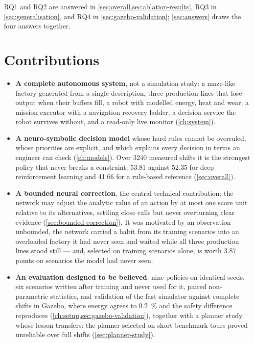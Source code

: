 RQ1 and RQ2 are answered in \cref{sec:overall,sec:ablation-results}, RQ3 in
\cref{sec:generalisation}, and RQ4 in \cref{sec:gazebo-validation}; \cref{sec:answers} draws the
four answers together.

\section{Contributions}
\label{sec:contributions}

\begin{itemize}[leftmargin=*, itemsep=0.25em]
  \item \textbf{A complete autonomous system}, not a simulation study: a maze-like factory
        generated from a single description, three production lines that lose output when their
        buffers fill, a robot with modelled energy, heat and wear, a mission executor with a
        navigation recovery ladder, a decision service the robot survives without, and a read-only
        live monitor (\cref{ch:system}).

  \item \textbf{A neuro-symbolic decision model} whose hard rules cannot be overruled, whose
        priorities are explicit, and which explains every decision in terms an engineer can check
        (\cref{ch:models}). Over \num{3240} measured shifts it is the strongest policy that never
        breaks a constraint: \num{53.81} against \num{52.35} for deep reinforcement learning and
        \num{41.66} for a rule-based reference (\cref{sec:overall}).

  \item \textbf{A bounded neural correction}, the central technical contribution: the network may
        adjust the analytic value of an action by at most one score unit relative to its
        alternatives, settling close calls but never overturning clear evidence
        (\cref{sec:bounded-correction}). It was motivated by an observation --- unbounded, the
        network carried a habit from its training scenarios into an overloaded factory it had never
        seen and waited while all three production lines stood still --- and, selected on training
        scenarios alone, is worth \num{3.87} points on scenarios the model had never seen.

  \item \textbf{An evaluation designed to be believed}: nine policies on identical seeds, six
        scenarios written after training and never used for it, paired non-parametric statistics,
        and validation of the fast simulator against complete shifts in Gazebo, where energy agrees
        to \SI{0.2}{\percent} and the safety difference reproduces
        (\cref{ch:setup,sec:gazebo-validation}), together with a planner study whose lesson
        transfers: the planner selected on short benchmark tours proved unreliable over full shifts
        (\cref{sec:planner-study}).
\end{itemize}


